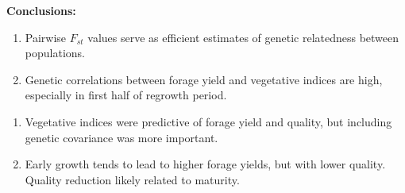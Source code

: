 \documentclass[10pt, letterpaper]{article}
\begin{document}
\large
\noindent%
\begin{minipage}[h]{.475\textwidth}
\textbf{Conclusions:}
\begin{enumerate}
	\item Pairwise $F_{st}$ values serve as efficient estimates of genetic relatedness between populations.%
	\item Genetic correlations between forage yield and vegetative indices are high, especially in first half of regrowth period.%
\end{enumerate}%
\end{minipage}%
\begin{minipage}[h]{.05\textwidth}
\quad
\end{minipage}
\begin{minipage}[h]{.475\textwidth}
\vspace{1mm}
\begin{enumerate}
	  \setlength\itemsep{0.2em}
	  \setcounter{enumi}{2}
	\item Vegetative indices were predictive of forage yield and quality, but including genetic covariance was more important.%
	\item Early growth tends to lead to higher forage yields, but with lower quality. Quality reduction likely related to maturity.%
\end{enumerate}%
\end{minipage}

\smallskip
\end{document}
